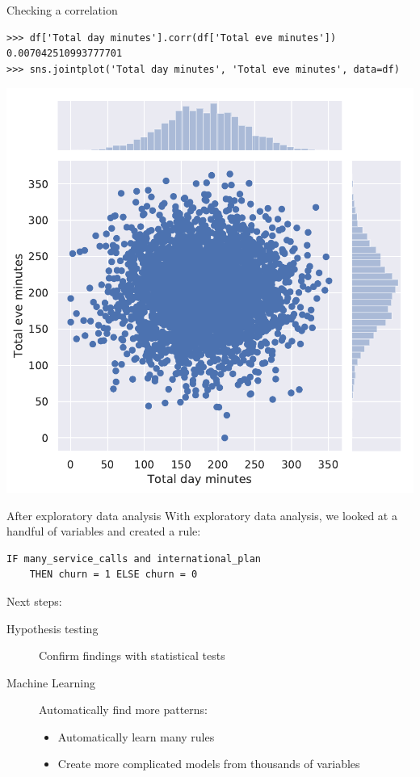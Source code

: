 \documentclass[aspectratio=169,usenames,dvipsnames]{beamer}
\begin{document}
\begin{frame}[fragile]{Checking a correlation}
\begin{lstlisting}
>>> df['Total day minutes'].corr(df['Total eve minutes'])
0.007042510993777701
>>> sns.jointplot('Total day minutes', 'Total eve minutes', data=df)
\end{lstlisting}

\includegraphics[height=0.6\textheight]{fig/scatter}
\end{frame}

\begin{frame}[fragile]{After exploratory data analysis}
With exploratory data analysis,
we looked at a handful of variables
and created a rule:

\begin{lstlisting}
IF many_service_calls and international_plan
    THEN churn = 1 ELSE churn = 0
\end{lstlisting}

Next steps:
\begin{description}
    \item[Hypothesis testing] Confirm findings with statistical tests
    \item[Machine Learning] Automatically find more patterns:
        \begin{itemize}
            \item Automatically learn many rules
            \item Create more complicated models from thousands of variables
        \end{itemize}
\end{description}
\end{frame}
\end{document}

